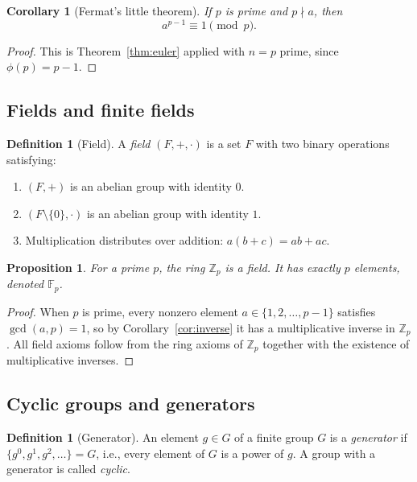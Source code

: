 \documentclass[twoside,12pt]{book}
\theoremstyle{plain}
\newtheorem{corollary}[theorem]{Corollary}
\newtheorem{proposition}[theorem]{Proposition}
\theoremstyle{definition}
\newtheorem{definition}[theorem]{Definition}
\theoremstyle{remark}
\begin{document}
\begin{corollary}[Fermat's little theorem]
\label{thm:fermat}
If $p$ is prime and $p \nmid a$, then
\[
a^{p-1} \equiv 1 \pmod{p}.
\]
\end{corollary}

\begin{proof}
This is Theorem~\ref{thm:euler} applied with $n = p$ prime, since $\phi(p) = p - 1$.
\end{proof}

\subsection{Fields and finite fields}

\begin{definition}[Field]
A \emph{field} $(F, +, \cdot)$ is a set $F$ with two binary operations satisfying:
\begin{enumerate}[nosep]
    \item $(F, +)$ is an abelian group with identity $0$.
    \item $(F \setminus \{0\}, \cdot)$ is an abelian group with identity $1$.
    \item Multiplication distributes over addition: $a(b + c) = ab + ac$.
\end{enumerate}
\end{definition}

\begin{proposition}
For a prime $p$, the ring $\mathbb{Z}_p$ is a field. It has exactly $p$ elements, denoted $\mathbb{F}_p$.
\end{proposition}

\begin{proof}
When $p$ is prime, every nonzero element $a \in \{1, 2, \ldots, p-1\}$ satisfies $\gcd(a, p) = 1$, so by Corollary~\ref{cor:inverse} it has a multiplicative inverse in $\mathbb{Z}_p$. All field axioms follow from the ring axioms of $\mathbb{Z}_p$ together with the existence of multiplicative inverses.
\end{proof}

\subsection{Cyclic groups and generators}

\begin{definition}[Generator]
An element $g \in G$ of a finite group $G$ is a \emph{generator} if $\{g^0, g^1, g^2, \ldots\} = G$, i.e., every element of $G$ is a power of $g$. A group with a generator is called \emph{cyclic}.
\end{definition}
\end{document}
